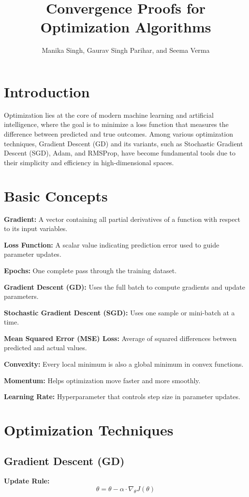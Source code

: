 \documentclass[12pt]{article}
\title{Convergence Proofs for Optimization Algorithms}
\author{Manika Singh, Gaurav Singh Parihar, and Seema Verma}
\date{}
\begin{document}
\maketitle

\section{Introduction}
Optimization lies at the core of modern machine learning and artificial intelligence, where the goal is to minimize a loss function that measures the difference between predicted and true outcomes. Among various optimization techniques, Gradient Descent (GD) and its variants, such as Stochastic Gradient Descent (SGD), Adam, and RMSProp, have become fundamental tools due to their simplicity and efficiency in high-dimensional spaces.

\section{Basic Concepts}

\textbf{Gradient:} A vector containing all partial derivatives of a function with respect to its input variables.  

\textbf{Loss Function:} A scalar value indicating prediction error used to guide parameter updates.  

\textbf{Epochs:} One complete pass through the training dataset.

\textbf{Gradient Descent (GD):} Uses the full batch to compute gradients and update parameters.

\textbf{Stochastic Gradient Descent (SGD):} Uses one sample or mini-batch at a time.

\textbf{Mean Squared Error (MSE) Loss:} Average of squared differences between predicted and actual values.

\textbf{Convexity:} Every local minimum is also a global minimum in convex functions.

\textbf{Momentum:} Helps optimization move faster and more smoothly.

\textbf{Learning Rate:} Hyperparameter that controls step size in parameter updates.

\section{Optimization Techniques}

\subsection{Gradient Descent (GD)}
\textbf{Update Rule:}
\[
\theta = \theta - \alpha \cdot \nabla_\theta J(\theta)
\]
\end{document}
